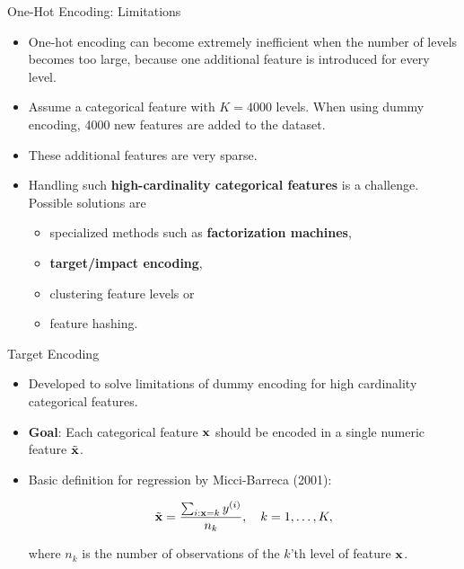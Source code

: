 \begin{vbframe}{One-Hot Encoding: Limitations}
  \begin{itemize}
    \item One-hot encoding can become extremely inefficient when the number of levels becomes too large, because one additional feature is introduced for every level.
    \item Assume a categorical feature with $K = 4000$ levels. When using dummy encoding, 4000 new features are added to the dataset.
    \item These additional features are very sparse.
    \item Handling such \textbf{high-cardinality categorical features} is a challenge. Possible solutions are
          \begin{itemize}

            \item specialized methods such as \textbf{factorization machines},
            \item \textbf{target/impact encoding},
            \item clustering feature levels or
            \item feature hashing.
          \end{itemize}
  \end{itemize}
\end{vbframe}


\begin{vbframe}{Target Encoding}
  \begin{itemize}
    \item Developed to solve limitations of dummy encoding for high cardinality categorical features.
    \item \textbf{Goal}: Each categorical feature $\mathbf{x}$ should be encoded in a single numeric feature $\tilde {\mathbf{x}}$.
          \medskip
    \item Basic definition for regression by Micci-Barreca (2001):
          
          $$
            \tilde {\mathbf{x}} = \frac{\sum_{i:\mathbf{x}=k} y^{(i)}}{n_k}, \quad k = 1,\dots,K,
          $$
          
          where $n_k$ is the number of observations of the $k$'th level of feature $\mathbf{x}$.
          
  \end{itemize}
  
\end{vbframe}

